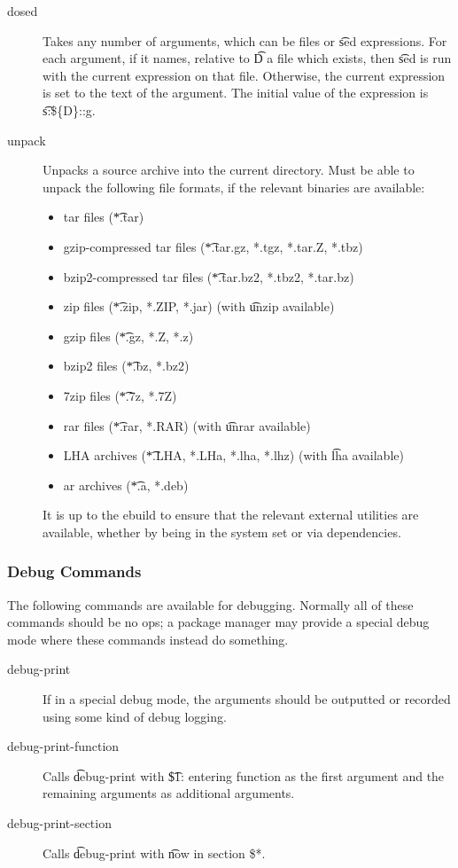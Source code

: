 \begin{description}
\item[dosed] Takes any number of arguments, which can be files or \t{sed} expressions. For each
    argument, if it names, relative to \t{D} a file which exists, then \t{sed} is run with the
    current expression on that file. Otherwise, the current expression is set to the text of the
    argument. The initial value of the expression is \t{s:\$\{D\}::g}.
\item[unpack] Unpacks a source archive into the current directory. Must be able to unpack the
    following file formats, if the relevant binaries are available:
    \begin{itemize}
    \item tar files (\t{*.tar})
    \item gzip-compressed tar files (\t{*.tar.gz, *.tgz, *.tar.Z, *.tbz})
    \item bzip2-compressed tar files (\t{*.tar.bz2, *.tbz2, *.tar.bz})
    \item zip files (\t{*.zip, *.ZIP, *.jar}) (with \t{unzip} available)
    \item gzip files (\t{*.gz, *.Z, *.z})
    \item bzip2 files (\t{*.bz, *.bz2})
    \item 7zip files (\t{*.7z, *.7Z})
    \item rar files (\t{*.rar, *.RAR}) (with \t{unrar} available)
    \item LHA archives (\t{*.LHA, *.LHa, *.lha, *.lhz}) (with \t{lha} available)
    \item ar archives (\t{*.a, *.deb})
    \end{itemize}
    It is up to the ebuild to ensure that the relevant external utilities are available, whether by
    being in the system set or via dependencies.
\end{description}

\subsubsection{Debug Commands}
The following commands are available for debugging. Normally all of these commands should be no ops;
a package manager may provide a special debug mode where these commands instead do something.

\begin{description}
\item[debug-print] If in a special debug mode, the arguments should be outputted or recorded using
    some kind of debug logging.
\item[debug-print-function] Calls \t{debug-print} with \t{\$1: entering function} as the first
    argument and the remaining arguments as additional arguments.
\item[debug-print-section] Calls \t{debug-print} with \t{now in section \$*}.
\end{description}

